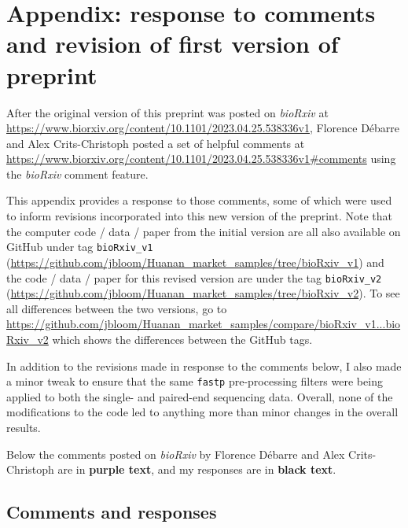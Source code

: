 \documentclass[9pt,twocolumn,twoside]{gsajnl_modified}
\begin{document}
\clearpage

\renewcommand{\thepage}{A\arabic{page}}
\setcounter{page}{1}
\renewcommand{\thefigure}{A\arabic{figure}}
\setcounter{figure}{0}
\renewcommand{\thetable}{A\arabic{table}}
\setcounter{table}{0}

\clearpage
\normalsize

\section{Appendix: response to comments and revision of first version of preprint}
After the original version of this preprint was posted on \textit{bioRxiv} at \url{https://www.biorxiv.org/content/10.1101/2023.04.25.538336v1}, Florence Débarre and Alex Crits-Christoph posted a set of helpful comments at \url{https://www.biorxiv.org/content/10.1101/2023.04.25.538336v1#comments} using the \textit{bioRxiv} comment feature.

This appendix provides a response to those comments, some of which were used to inform revisions incorporated into this new version of the preprint.
Note that the computer code / data / paper from the initial version are all also available on GitHub under tag \texttt{bioRxiv\_v1} (\url{https://github.com/jbloom/Huanan_market_samples/tree/bioRxiv_v1}) and the code / data / paper for this revised version are under the tag \texttt{bioRxiv\_v2} (\url{https://github.com/jbloom/Huanan_market_samples/tree/bioRxiv_v2}).
To see all differences between the two versions, go to \url{https://github.com/jbloom/Huanan_market_samples/compare/bioRxiv_v1...bioRxiv_v2} which shows the differences between the GitHub tags.

In addition to the revisions made in response to the comments below, I also made a minor tweak to ensure that the same \texttt{fastp} pre-processing filters were being applied to both the single- and paired-end sequencing data.
Overall, none of the modifications to the code led to anything more than minor changes in the overall results.

Below the comments posted on \textit{bioRxiv} by Florence Débarre and Alex Crits-Christoph are in {\bf \color{purple} purple text}, and my responses are in {\bf black text}.

\color{purple}

\subsection{Comments and responses}
\end{document}
